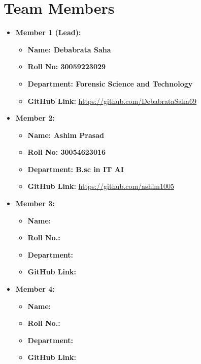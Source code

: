 \documentclass[a4paper,15pt]{article}
\begin{document}
\section*{Team Members}
\begin{itemize}[leftmargin=1.5cm]
    \item \textbf{Member 1 (Lead):} 
    \begin{itemize}[leftmargin=1.5cm]
        \item \textbf{Name: Debabrata Saha} 
        \item \textbf{Roll No: 30059223029}
        \item \textbf{Department: Forensic Science and Technology} 
        \item \textbf{GitHub Link:} \url{https://github.com/DebabrataSaha69}
\end{itemize}

    \item \textbf{Member 2:} 
    \begin{itemize}[leftmargin=1.5cm]
        \item \textbf{Name: Ashim Prasad } 
        \item \textbf{Roll No: 30054623016 } 
        \item \textbf{Department: B.sc in IT AI } 
        \item \textbf{GitHub Link:} \url{https://github.com/ashim1005}
    \end{itemize}

    \item \textbf{Member 3:} 
    \begin{itemize}[leftmargin=1.5cm]
        \item \textbf{Name: } 
        \item \textbf{Roll No.: } 
        \item \textbf{Department: } 
        \item \textbf{GitHub Link:} \url{}
    \end{itemize}

    \item \textbf{Member 4:} 
    \begin{itemize}[leftmargin=1.5cm]
        \item \textbf{Name: } 
        \item \textbf{Roll No.: } 
        \item \textbf{Department:  } 
        \item \textbf{GitHub Link:} \url{}
    \end{itemize}


\end{itemize}
\end{document}
